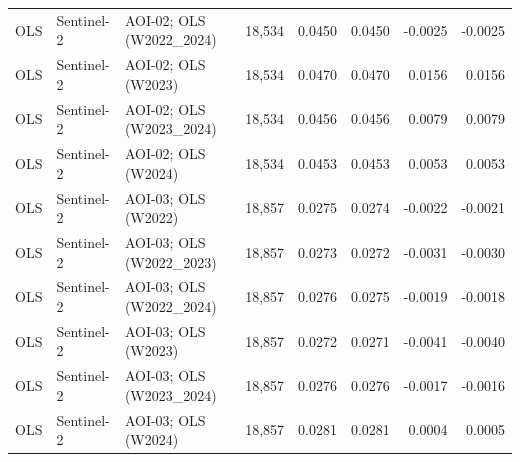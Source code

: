 \begin{landscape}
\begin{longtable}{lllrrrrr}
OLS & Sentinel-2 & AOI-02; OLS (W2022\_2024) & 18,534 & 0.0450 & 0.0450 & -0.0025 & -0.0025 \\
OLS & Sentinel-2 & AOI-02; OLS (W2023) & 18,534 & 0.0470 & 0.0470 & 0.0156 & 0.0156 \\
OLS & Sentinel-2 & AOI-02; OLS (W2023\_2024) & 18,534 & 0.0456 & 0.0456 & 0.0079 & 0.0079 \\
OLS & Sentinel-2 & AOI-02; OLS (W2024) & 18,534 & 0.0453 & 0.0453 & 0.0053 & 0.0053 \\
OLS & Sentinel-2 & AOI-03; OLS (W2022) & 18,857 & 0.0275 & 0.0274 & -0.0022 & -0.0021 \\
OLS & Sentinel-2 & AOI-03; OLS (W2022\_2023) & 18,857 & 0.0273 & 0.0272 & -0.0031 & -0.0030 \\
OLS & Sentinel-2 & AOI-03; OLS (W2022\_2024) & 18,857 & 0.0276 & 0.0275 & -0.0019 & -0.0018 \\
OLS & Sentinel-2 & AOI-03; OLS (W2023) & 18,857 & 0.0272 & 0.0271 & -0.0041 & -0.0040 \\
OLS & Sentinel-2 & AOI-03; OLS (W2023\_2024) & 18,857 & 0.0276 & 0.0276 & -0.0017 & -0.0016 \\
OLS & Sentinel-2 & AOI-03; OLS (W2024) & 18,857 & 0.0281 & 0.0281 & 0.0004 & 0.0005 \\
\bottomrule\end{longtable}
\end{landscape}
